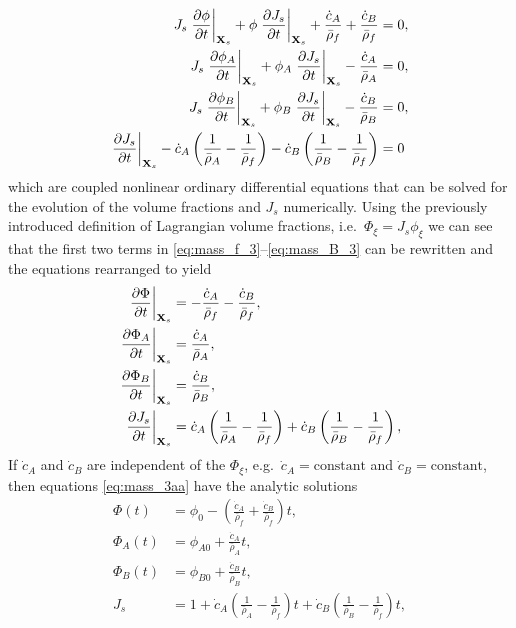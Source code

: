 \documentclass[11pt]{article}
\begin{document}
%
\begin{subequations}
\begin{align}
  J_s \left.\frac{\partial \phi}{\partial t}\right\vert_{\mathbf{X}_s} + \phi \left.\frac{\partial J_s}{\partial t}\right\vert_{\mathbf{X}_s}   +\frac{\dot{c}_A}{\bar\rho_f} +\frac{\dot{c}_B}{\bar\rho_f} &= 0, \label{eq:mass_f_3} \\
  J_s \left.\frac{\partial \phi_A}{\partial t}\right\vert_{\mathbf{X}_s} + \phi_A \left.\frac{\partial J_s}{\partial t}\right\vert_{\mathbf{X}_s} - \frac{\dot{c}_A}{\bar\rho_A} &= 0, \label{eq:mass_A_3} \\
  J_s \left.\frac{\partial \phi_B}{\partial t}\right\vert_{\mathbf{X}_s} + \phi_B \left.\frac{\partial J_s}{\partial t}\right\vert_{\mathbf{X}_s}  - \frac{\dot{c}_B}{\bar\rho_B} &= 0, \label{eq:mass_B_3} \\
  \left.\frac{\partial J_s}{\partial t}\right\vert_{\mathbf{X}_s} - \dot{c}_A\left(\frac{1}{\bar{\rho}_A} - \frac{1}{\bar{\rho}_f}\right) - \dot{c}_B\left(\frac{1}{\bar{\rho}_B} - \frac{1}{\bar{\rho}_f} \right) &= 0
\end{align}
\end{subequations}
%
which are coupled nonlinear ordinary differential equations that can be solved for the evolution of the volume fractions and $J_s$ numerically.  Using the previously introduced definition of Lagrangian volume fractions, i.e.\ $\Phi_\xi = J_s \phi_\xi$ we can see that the first two terms in \eqref{eq:mass_f_3}--\eqref{eq:mass_B_3} can be rewritten and the equations rearranged to yield
%
\begin{subequations}
\begin{align}
  \left.\frac{\partial \Phi}{\partial t}\right\vert_{\mathbf{X}_s} &= -\frac{\dot{c}_A}{\bar\rho_f} - \frac{\dot{c}_B}{\bar\rho_f}, \label{eq:mass_f_3a} \\
  \left.\frac{\partial \Phi_A}{\partial t}\right\vert_{\mathbf{X}_s} &= \frac{\dot{c}_A}{\bar\rho_A}, \label{eq:mass_A_3a} \\
  \left.\frac{\partial \Phi_B}{\partial t}\right\vert_{\mathbf{X}_s} &= \frac{\dot{c}_B}{\bar\rho_B}, \label{eq:mass_B_3a} \\
  \left.\frac{\partial J_s}{\partial t}\right\vert_{\mathbf{X}_s} &=  \dot{c}_A\left(\frac{1}{\bar{\rho}_A} - \frac{1}{\bar{\rho}_f}\right) + \dot{c}_B\left(\frac{1}{\bar{\rho}_B} - \frac{1}{\bar{\rho}_f} \right), \label{eq:mass_J_3a}
\end{align}
  \label{eq:mass_3aa}
\end{subequations}
%
If $\dot{c}_{A}$ and $\dot{c}_{B}$ are independent of the $\Phi_\xi$, e.g.\ $\dot{c}_{A} = \text{constant}$ and $\dot{c}_{B} = \text{constant}$, then equations \eqref{eq:mass_3aa} have the analytic solutions
%
\begin{subequations}
\begin{align}
  \Phi(t) &= \phi_0 - \left(\frac{\dot{c}_A}{\bar\rho_f} + \frac{\dot{c}_B}{\bar\rho_f}\right) t, \label{eq:mass_f_3a_sol} \\
  \Phi_A(t) &= \phi_{A0} + \frac{\dot{c}_A}{\bar\rho_A} t, \label{eq:mass_A_3a_sol} \\
  \Phi_B(t) &= \phi_{B0} + \frac{\dot{c}_B}{\bar\rho_B} t, \label{eq:mass_B_3a_sol} \\
  J_s &=  1 + \dot{c}_A\left(\frac{1}{\bar{\rho}_A} - \frac{1}{\bar{\rho}_f}\right)t + \dot{c}_B\left(\frac{1}{\bar{\rho}_B} - \frac{1}{\bar{\rho}_f} \right) t, \label{eq:mass_J_3a_sol}
\end{align}
\end{subequations}
\end{document}
